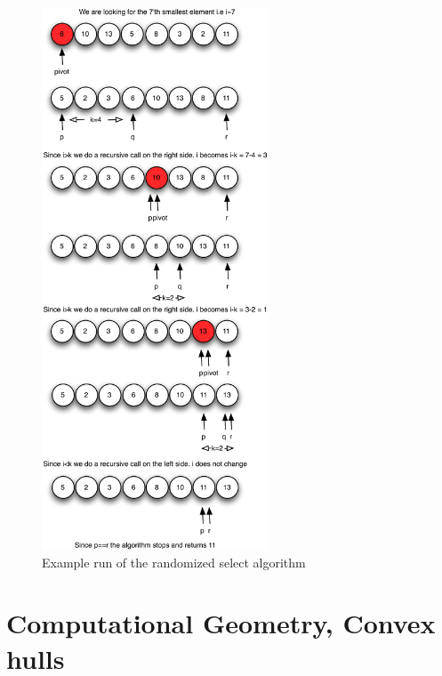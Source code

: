 \documentclass[10pt]{article}
\begin{document}
\begin{figure}[ht]
\centering
\includegraphics[width=0.6\textwidth]{figures/fig10.pdf}
\caption{Example run of the randomized select algorithm}
\label{fig10}
\end{figure}




\clearpage \newpage
\section{Computational Geometry, Convex hulls} %
\label{sec:computational_geometry_convex_hulls}
\end{document}
